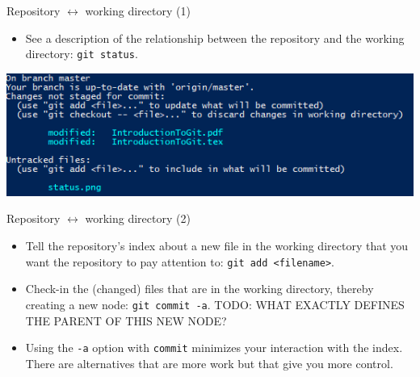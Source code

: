 \documentclass[usenames,dvipsnames]{beamer}
\newcommand{\code}[1]{\colorbox{light-gray}{\texttt{#1}}}
\begin{document}
\begin{frame}{Repository $\leftrightarrow$ working directory (1)}
  \begin{block}{}
    \begin{itemize}
      \item{See a description of the relationship between the repository and the working directory: \code{git status}.}
    \end{itemize}
  \end{block}
  \begin{block}{}
    \begin{center}
      \includegraphics[scale=0.8]{status.png}
    \end{center}
  \end{block}
\end{frame}

\begin{frame}{Repository $\leftrightarrow$ working directory (2)}
  \begin{block}{}
    \begin{itemize}
      \item{Tell the repository's index about a new file in the working directory that you want the repository to pay attention to: \code{git add <filename>}.}
      \item{Check-in the (changed) files that are in the working directory, thereby creating a new node: \code{git commit -a}. TODO: WHAT EXACTLY DEFINES THE PARENT OF THIS NEW NODE?}
      \item{Using the \code{-a} option with \code{commit} minimizes your interaction with the index. There are alternatives that are more work but that give you more control.}
    \end{itemize}
  \end{block}
\end{frame}
\end{document}
